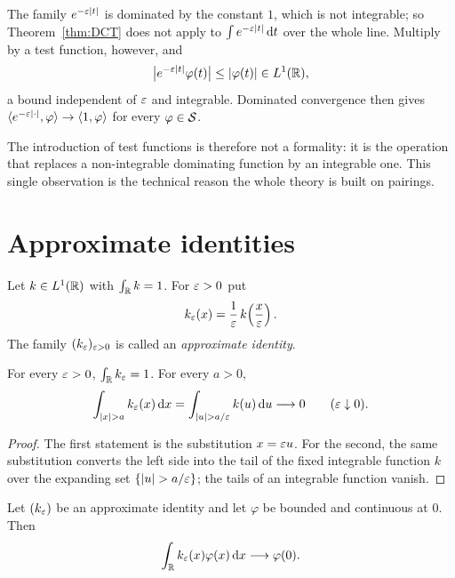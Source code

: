 \begin{remark}
The family $e^{-\varepsilon|t|}$ is dominated by the constant $1$, which is not integrable; so
Theorem~\ref{thm:DCT} does not apply to $\int e^{-\varepsilon|t|}\,\mathrm{d} t$ over the whole line. Multiply by a
test function, however, and
\begin{equation}
\big|e^{-\varepsilon|t|}\varphi(t)\big|\le|\varphi(t)|\in L^{1}(\mathbb{R}) ,
\end{equation}
a bound independent of $\varepsilon$ and integrable. Dominated convergence then gives
$\langle e^{-\varepsilon|\cdot|},\varphi\rangle\to\langle 1,\varphi\rangle$ for every $\varphi\in\mathcal{S}$.

The introduction of test functions is therefore not a formality: it is the operation that replaces a
non-integrable dominating function by an integrable one. This single observation is the technical
reason the whole theory is built on pairings.
\end{remark}

\section{Approximate identities}

\begin{definition}\label{def:approxid}
Let $k\in L^{1}(\mathbb{R})$ with $\int_{\mathbb{R}}k=1$. For $\varepsilon>0$ put
\begin{equation}
k_{\varepsilon}(x)=\frac{1}{\varepsilon}\,k\!\left(\frac{x}{\varepsilon}\right).
\label{eq:dilate-k}
\end{equation}
The family $(k_{\varepsilon})_{\varepsilon>0}$ is called an \emph{approximate identity}.
\end{definition}

\begin{lemma}\label{lem:mass-tail}
For every $\varepsilon>0$, $\int_{\mathbb{R}}k_{\varepsilon}=1$. For every $a>0$,
\begin{equation}
\int_{|x|>a}k_{\ep}(x)\dd x=\int_{|u|>a/\ep}k(u)\dd u\longrightarrow0
\qquad(\ep\downarrow0).
\label{eq:tail}
\end{equation}
\end{lemma}

\begin{proof}
The first statement is the substitution $x=\varepsilon u$. For the second, the same substitution converts the
left side into the tail of the fixed integrable function $k$ over the expanding set
$\{|u|>a/\ep\}$; the tails of an integrable function vanish.
\end{proof}

\begin{theorem}[sampling]\label{thm:sampling-general}
Let $(k_{\varepsilon})$ be an approximate identity and let $\varphi$ be bounded and continuous at $0$. Then
\begin{equation}
\int_{\mathbb{R}}k_{\varepsilon}(x)\varphi(x)\,\mathrm{d} x\longrightarrow\varphi(0).
\label{eq:sampling-general}
\end{equation}
\end{theorem}

